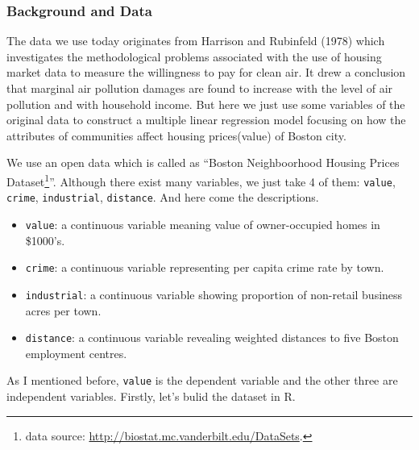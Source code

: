 \documentclass[
  12pt,
]{article}
\providecommand{\tightlist}{%
  \setlength{\itemsep}{0pt}\setlength{\parskip}{0pt}}
\begin{document}
\hypertarget{background-and-data-6}{%
\subsubsection{Background and Data}\label{background-and-data-6}}

The data we use today originates from Harrison and Rubinfeld (1978) which investigates the methodological problems associated with the use of housing market data to measure the willingness to pay for clean air. It drew a conclusion that marginal air pollution damages are found to increase with the level of air pollution and with household income. But here we just use some variables of the original data to construct a multiple linear regression model focusing on how the attributes of communities affect housing prices(value) of Boston city.

We use an open data which is called as ``Boston Neighboorhood Housing Prices Dataset\footnote{data source: \url{http://biostat.mc.vanderbilt.edu/DataSets}.}''. Although there exist many variables, we just take 4 of them: \texttt{value}, \texttt{crime}, \texttt{industrial}, \texttt{distance}. And here come the descriptions.

\begin{itemize}
\tightlist
\item
  \texttt{value}: a continuous variable meaning value of owner-occupied homes in \$1000's.
\item
  \texttt{crime}: a continuous variable representing per capita crime rate by town.
\item
  \texttt{industrial}: a continuous variable showing proportion of non-retail business acres per town.
\item
  \texttt{distance}: a continuous variable revealing weighted distances to five Boston employment centres.
\end{itemize}

As I mentioned before, \texttt{value} is the dependent variable and the other three are independent variables. Firstly, let's bulid the dataset in R.
\end{document}
